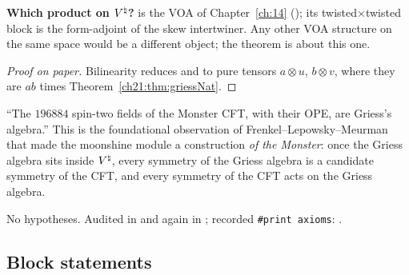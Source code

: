 \begin{dictionary}
\textbf{Which product on ${V^{\natural}}$?}   is the VOA of Chapter~\ref{ch:14}
(); its twisted$\times$twisted block is the form-adjoint of the
skew intertwiner.  Any other VOA structure on the same space would be a different object; the theorem is
about this one.
\end{dictionary}
\begin{proof}[Proof on paper]
Bilinearity reduces  and  to pure tensors
$a\otimes u$, $b\otimes v$, where they are $ab$ times Theorem~\ref{ch21:thm:griessNat}.
\end{proof}
\begin{physics}
``The $196884$ spin-two fields of the Monster CFT, with their OPE, are Griess's algebra.''  This is the
foundational observation of Frenkel--Lepowsky--Meurman that made the moonshine module a construction
\emph{of the Monster}: once the Griess algebra sits inside ${V^{\natural}}$, every symmetry of the Griess algebra
is a candidate symmetry of the CFT, and every symmetry of the CFT acts on the Griess algebra.
\end{physics}
\begin{status}
No hypotheses.  Audited in  and again in
; recorded \texttt{\#print axioms}:
.
\end{status}

\subsection{Block statements}

